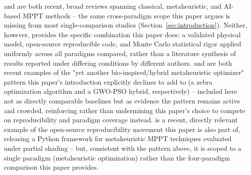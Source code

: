 \cite{endiz2025review} and \cite{yaqoob2025advanced} are both recent,
broad reviews spanning classical, metaheuristic, and AI-based MPPT
methods -- the same cross-paradigm scope this paper argues is missing from
most single-comparison studies (Section~\ref{sec:introduction}). Neither,
however, provides the specific combination this paper does: a validated
physical model, open-source reproducible code, and Monte Carlo statistical
rigor applied uniformly across all paradigms compared, rather than a
literature synthesis of results reported under differing conditions by
different authors. \cite{abdelmalek2024experimental} and
\cite{taha2025design} are both recent examples of the "yet another
bio-inspired/hybrid metaheuristic optimizer" pattern this paper's
introduction explicitly declines to add to (a zebra optimization algorithm
and a GWO-PSO hybrid, respectively) -- included here not as directly
comparable baselines but as evidence the pattern remains active and
crowded, reinforcing rather than undermining this paper's choice to compete
on reproducibility and paradigm coverage instead. \cite{ashraf2025python}
is a recent, directly relevant example of the open-source reproducibility
movement this paper is also part of, releasing a Python framework for
metaheuristic MPPT techniques evaluated under partial shading -- but,
consistent with the pattern above, it is scoped to a single paradigm
(metaheuristic optimization) rather than the four-paradigm comparison this
paper provides.

